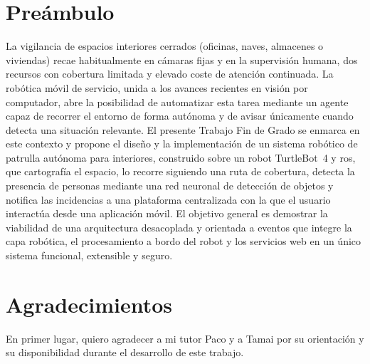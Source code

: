 
\chapter*{Preámbulo}

La vigilancia de espacios interiores cerrados (oficinas, naves, almacenes o
viviendas) recae habitualmente en cámaras fijas y en la supervisión humana, dos
recursos con cobertura limitada y elevado coste de atención continuada. La
robótica móvil de servicio, unida a los avances recientes en visión por
computador, abre la posibilidad de automatizar esta tarea mediante un agente
capaz de recorrer el entorno de forma autónoma y de avisar únicamente cuando
detecta una situación relevante. El presente Trabajo Fin de Grado se enmarca en
este contexto y propone el diseño y la implementación de un sistema robótico de
patrulla autónoma para interiores, construido sobre un robot \mbox{TurtleBot~4} y
\gls{ros}, que cartografía el espacio, lo recorre siguiendo una ruta de
cobertura, detecta la presencia de personas mediante una red neuronal de
detección de objetos y notifica las incidencias a una plataforma centralizada
con la que el usuario interactúa desde una aplicación móvil. El objetivo general
es demostrar la viabilidad de una arquitectura desacoplada y orientada a eventos
que integre la capa robótica, el procesamiento a bordo del robot y los servicios web
en un único sistema funcional, extensible y seguro.

\cleardoublepage

\chapter*{Agradecimientos}

En primer lugar, quiero agradecer a mi tutor Paco y a Tamai por su
orientación y su disponibilidad durante el desarrollo de este trabajo.

